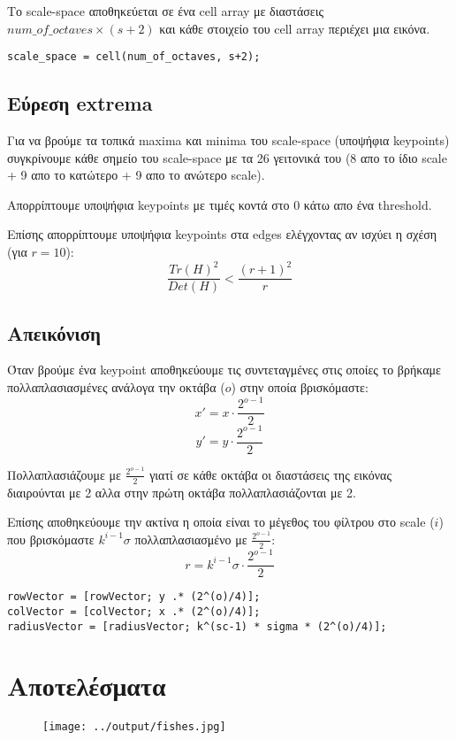 \documentclass[11pt]{scrartcl} %
\begin{document}
Το scale-space αποθηκεύεται σε ένα cell array με διαστάσεις $num\_of\_octaves \times (s+2)$ και κάθε στοιχείο του cell array περιέχει μια εικόνα.
\begin{verbatim}
scale_space = cell(num_of_octaves, s+2);
\end{verbatim}

\subsection{Εύρεση extrema}

Για να βρούμε τα τοπικά maxima και minima του scale-space (υποψήφια keypoints) συγκρίνουμε κάθε σημείο του scale-space με τα 26 γειτονικά του (8 απο το ίδιο scale + 9 απο το κατώτερο + 9 απο το ανώτερο scale).

Απορρίπτουμε υποψήφια keypoints με τιμές κοντά στο 0 κάτω απο ένα threshold.

Επίσης απορρίπτουμε υποψήφια keypoints στα edges ελέγχοντας αν ισχύει η σχέση (για $r = 10$):
\[\frac{Tr(H)^2}{Det(H)} < \frac{(r+1)^2}{r}\]

\subsection{Απεικόνιση}

Όταν βρούμε ένα keypoint αποθηκεύουμε τις συντεταγμένες στις οποίες το βρήκαμε πολλαπλασιασμένες ανάλογα την οκτάβα ($ο$) στην οποία βρισκόμαστε:
\[x' = x \cdot \frac{2^{o-1}}{2}\]
\[y' = y \cdot \frac{2^{o-1}}{2}\]

Πολλαπλασιάζουμε με $\frac{2^{o-1}}{2}$ γιατί σε κάθε οκτάβα οι διαστάσεις της εικόνας διαιρούνται με 2 αλλα στην πρώτη οκτάβα πολλαπλασιάζονται με 2.

Επίσης αποθηκεύουμε την ακτίνα η οποία είναι το μέγεθος του φίλτρου στο scale ($i$) που βρισκόμαστε $k^{i-1} \sigma$ πολλαπλασιασμένο με $\frac{2^{o-1}}{2}$:
\[r = k^{i-1} \sigma \cdot \frac{2^{o-1}}{2}\]

\begin{verbatim}
rowVector = [rowVector; y .* (2^(o)/4)];
colVector = [colVector; x .* (2^(o)/4)];
radiusVector = [radiusVector; k^(sc-1) * sigma * (2^(o)/4)];
\end{verbatim}

\section{Αποτελέσματα}

\begin{figure}[H]
  \centerline{\texttt{[image: ../output/fishes.jpg]}}
  \caption{}
\end{figure}
\end{document}
